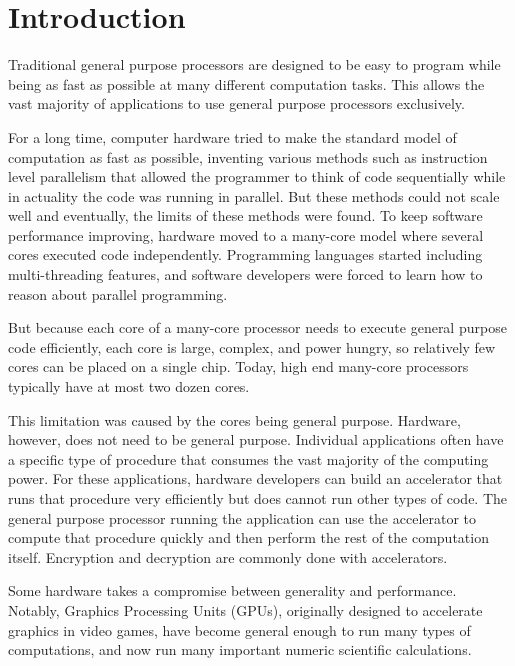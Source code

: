 \documentclass[12pt,twoside]{reedthesis}
\begin{document}


\chapter*{Introduction}
\lstset{language=C++}


		Traditional general purpose processors are designed to be easy to program while being as fast as possible at many different computation tasks. This allows the vast majority of applications to use general purpose processors exclusively. 
		
		For a long time, computer hardware tried to make the standard model of computation as fast as possible, inventing various methods such as instruction level parallelism that allowed the programmer to think of code sequentially while in actuality the code was running in parallel.
		But these methods could not scale well and eventually, the limits of these methods were found. To keep software performance improving, hardware moved to a many-core model where several cores executed code independently. Programming languages started including multi-threading features, and software developers were forced to learn how to reason about parallel programming. 
		
		But because each core of a many-core processor needs to execute general purpose code efficiently, each core is large, complex, and power hungry, so relatively few cores can be placed on a single chip. Today, high end many-core processors typically have at most two dozen cores. 
		
		This limitation was caused by the cores being general purpose. Hardware, however, does not need to be general purpose. 
		Individual applications often have a specific type of procedure that consumes the vast majority of the computing power. For these applications, hardware developers can build an accelerator that runs that procedure very efficiently but does cannot run other types of code. The general purpose processor running the application can use the accelerator to compute that procedure quickly and then perform the rest of the computation itself. Encryption and decryption are commonly done with accelerators. 
		
		Some hardware takes a compromise between generality and performance. Notably, Graphics Processing Units (GPUs), originally designed to accelerate graphics in video games, have become general enough to run many types of computations, and now run many important numeric scientific calculations. 
		
\end{document}
